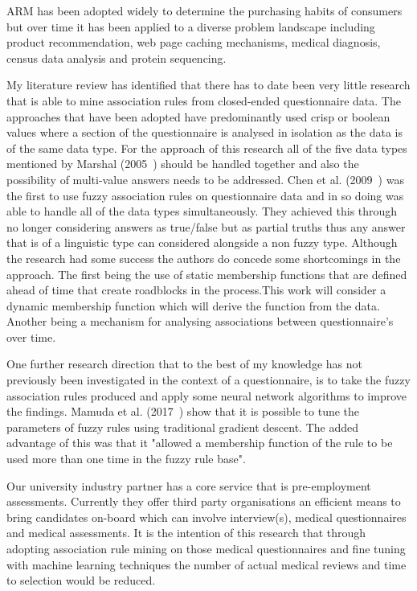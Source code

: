 ARM has been adopted widely to determine the purchasing habits of consumers but over time it has been applied to a diverse problem landscape including product recommendation, web page caching mechanisms, medical diagnosis, census data analysis and protein sequencing.

My literature review has identified that there has to date been very little research that is able to mine association rules from closed-ended questionnaire data. The approaches that have been adopted have predominantly used crisp or boolean values where a section of the questionnaire is analysed in isolation as the data is of the same data type. For the approach of this research all of the five data types mentioned by Marshal (2005~\cite{marshall2005purpose}) should be handled together and also the possibility of multi-value answers needs to be addressed. Chen et al. (2009~\cite{chen2009mining}) was the first to use fuzzy association rules on questionnaire data and in so doing was able to handle all of the data types simultaneously. They achieved this through no longer considering answers as true/false but as partial truths thus any answer that is of a linguistic type can considered alongside a non fuzzy type. Although the research had some success the authors do concede some shortcomings in the approach. The first being the use of static membership functions that are defined ahead of time that create roadblocks in the process.This work will consider a dynamic membership function which will derive the function from the data. Another being a mechanism for analysing associations between questionnaire's over time. 

One further research direction that to the best of my knowledge has not previously been investigated in the context of a questionnaire, is to take the fuzzy association rules produced and apply some neural network algorithms to improve the findings. Mamuda et al. (2017~\cite{mamuda2017fusion}) show that it is possible to tune the parameters of fuzzy rules using traditional gradient descent. The added advantage of this was that it "allowed a membership function of the rule to be used more than one time in the fuzzy rule base". 


Our university industry partner has a core service that is pre-employment assessments. Currently they offer third party organisations an efficient means to bring candidates on-board which can involve interview(s), medical questionnaires and medical assessments. It is the intention of this research that through adopting association rule mining on those medical questionnaires and fine tuning with machine learning techniques the number of actual medical reviews and time to selection would be reduced. 

